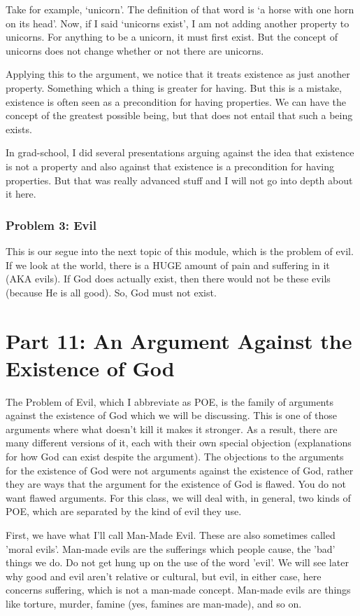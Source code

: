 Take for example, ‘unicorn’. The definition of that word is ‘a horse with one horn on its head’. Now, if I said ‘unicorns exist’, I am not adding another property to unicorns. For anything to be a unicorn, it must first exist. But the concept of unicorns does not change whether or not there are unicorns.

Applying this to the argument, we notice that it treats existence as just another property. Something which a thing is greater for having. But this is a mistake, existence is often seen as a precondition for having properties. We can have the concept of the greatest possible being, but that does not entail that such a being exists.

In grad-school, I did several presentations arguing against the idea that existence is not a property and also against that existence is a precondition for having properties. But that was really advanced stuff and I will not go into depth about it here.

\subsection{Problem 3: Evil}
This is our segue into the next topic of this module, which is the problem of evil. If we look at the world, there is a HUGE amount of pain and suffering in it (AKA evils). If God does actually exist, then there would not be these evils (because He is all good). So, God must not exist. 

\chapter{Part 11: An Argument Against the Existence of God}

The Problem of Evil, which I abbreviate as POE, is the family of arguments against the existence of God which we will be discussing. This is one of those arguments where what doesn't kill it makes it stronger. As a result, there are many different versions of it, each with their own special objection (explanations for how God can exist despite the argument). The objections to the arguments for the existence of God were not arguments against the existence of God, rather they are ways that the argument for the existence of God is flawed. You do not want flawed arguments. For this class, we will deal with, in general, two kinds of POE, which are separated by the kind of evil they use. 

First, we have what I'll call Man-Made Evil. These are also sometimes called 'moral evils'. Man-made evils are the sufferings which people cause, the 'bad' things we do. Do not get hung up on the use of the word 'evil'. We will see later why good and evil aren't relative or cultural, but evil, in either case, here concerns suffering, which is not a man-made concept. Man-made evils are things like torture, murder, famine (yes, famines are man-made), and so on. 

